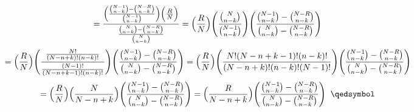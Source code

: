 \documentclass{article}
\begin{document}
\begin{center}
    \[=\frac{\Big{(}\frac{\binom{N-1}{n-k} -\binom{N-R}{n-k}}{\binom{N-1}{n-k}}\Big{)}\Big{(}\frac{R}{N}\Big{)}}{\frac{\binom{N}{n-k} -\binom{N-R}{n-k}}{\binom{N}{n-k}}} =\Big{(}\frac{R}{N}\Big{)}\Bigg{(}\frac{\binom{N}{n-k}}{\binom{N-1}{n-k}}\Bigg{)}\Bigg{(}\frac{\binom{N-1}{n-k} -\binom{N-R}{n-k}}{\binom{N}{n-k} -\binom{N-R}{n-k}}\Bigg{)}\]
    \[=\Big{(}\frac{R}{N}\Big{)}\Bigg{(}\frac{\frac{N!}{(N-n+k)!(n-k)!}}{\frac{(N-1)!}{(N-n+k-1)!(n-k)!}}\Bigg{)}\Bigg{(}\frac{\binom{N-1}{n-k} -\binom{N-R}{n-k}}{\binom{N}{n-k} -\binom{N-R}{n-k}}\Bigg{)} =\Big{(}\frac{R}{N}\Big{)}\Bigg{(}\frac{N!(N-n+k-1)!(n-k)!}{(N-n+k)!(n-k)!(N-1)!}\Bigg{)}\Bigg{(}\frac{\binom{N-1}{n-k} -\binom{N-R}{n-k}}{\binom{N}{n-k} -\binom{N-R}{n-k}}\Bigg{)}\]
    \[=\Big{(}\frac{R}{N}\Big{)}\Big{(}\frac{N}{N-n+k}\Big{)}\Bigg{(}\frac{\binom{N-1}{n-k} -\binom{N-R}{n-k}}{\binom{N}{n-k} -\binom{N-R}{n-k}}\Bigg{)} =\Big{(}\frac{R}{N-n+k}\Big{)}\Bigg{(}\frac{\binom{N-1}{n-k} -\binom{N-R}{n-k}}{\binom{N}{n-k} -\binom{N-R}{n-k}}\Bigg{)}\;\;\qedsymbol\]
\end{center}
\end{document}
